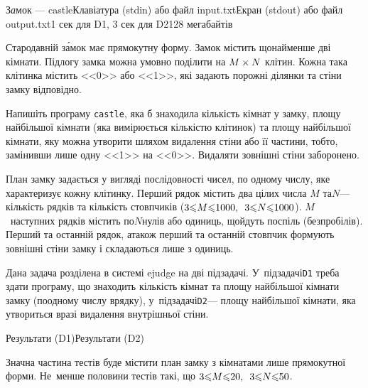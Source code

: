 \documentclass[14pt,a4paper]{extarticle}
\begin{document}
\vspace{10mm}\par
\begin{problem}{З\emph{а}мок --- castle}{Клавіатура (stdin) або файл input.txt}{Екран (stdout) або файл output.txt}{1 сек для D1, 3 сек для D2}{128 мегабайтів}


Стародавній з\'{а}мок має прямокутну форму. Замок містить щонайменше дві кімнати. Підлогу замка можна умовно поділити на $M\times N$ клітин. Кожна така клітинка містить <<0>> або <<1>>, які задають порожні ділянки та стіни замку відповідно.

\Task Напишіть програму \texttt{castle}, яка б знаходила кількість кімнат у зам\-ку, площу найбільшої кімнати (яка вимірюється кількістю клітинок) та площу найбільшої кімнати, яку можна утворити шляхом видалення стіни або її частини, тобто, замінивши лише одну <<1>> на <<0>>. Видаляти зовнішні стіни заборонено.

\InputFile План замку задається у вигляді послідовності чисел, по одному числу, яке характеризує кожну клітинку. Перший рядок містить два цілих числа $M$ та\nolinebreak[2] $N$\nolinebreak[3] --- кількість рядків та кількість стовпчиків (${3{\<}M{\<}1000},\hspace{0.5em plus 1em}{3{\<}N{\<}1000}$). $M$~наступних рядків містить по\nolinebreak[3] $N$\nolinebreak[3] нулів або одиниць, що\nolinebreak[3] йдуть поспіль (без\nolinebreak[2] пробілів). Перший та останній рядок, а\nolinebreak[3] також перший та останній стовпчик формують зовнішні стіни замку і складаються лише з одиниць.

\OutputFile Дана задача розділена в системі ejudge на дві підзадачі. У~підзадачі\nolinebreak[3] \texttt{D1} треба здати програму, що знаходить кількість кімнат та площу найбільшої кімнати замку (по\nolinebreak[3] одному числу в\nolinebreak[3] рядку), у~підзадачі\nolinebreak[2] \texttt{D2}\nolinebreak[3] --- площу найбільшої кімнати, яка утвориться в\nolinebreak[3] разі видалення внутрішньої стіни.

\Examples\nopagebreak

\begin{exampleSimpleThreeWithSpecNameColTwo}{7em}{3em}{3em}{Результати (D1)}{Результати (D2)}%
%
%
\end{exampleSimpleThreeWithSpecNameColTwo}

\Scoring Значна частина тестів буде містити план замку з кімнатами лише прямокутної форми. Не~менше половини тестів такі, що ${3{\<}M{\<}20},\hspace{0.5em plus 1em}{3{\<}N{\<}50}$.

\end{problem}
	
\end{document}
